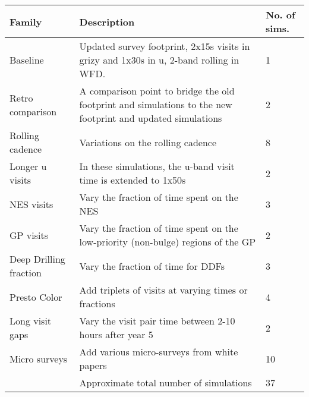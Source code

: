 
\begin{table}[]
\begin{tabular}{l | L | l}
Family               & Description       &    No. of sims.   \\
\hline\hline
Baseline            & Updated survey footprint, 2x15s visits in grizy and 1x30s in u, 2-band rolling in WFD. &   1     \\
Retro comparison     & A comparison point to bridge the old footprint and simulations to the new footprint and updated simulations  & 2 \\
Rolling cadence      & Variations on the rolling cadence   & 8  \\
Longer u visits  &  In these simulations, the u-band visit time is extended to 1x50s    &    2 \\
NES visits & Vary the fraction of time spent on the NES & 3 \\
GP visits & Vary the fraction of time spent on the low-priority (non-bulge) regions of the GP & 2 \\
Deep Drilling fraction & Vary the fraction of time for DDFs & 3 \\
Presto Color & Add triplets of visits at varying times or fractions  & 4 \\
Long visit gaps & Vary the visit pair time between 2-10 hours after year 5  &  2 \\
Micro surveys & Add various micro-surveys from white papers  & 10 \\
\hline
 & Approximate total number of simulations &  37 \\
\hline
\end{tabular}
\end{table}\label{tab:shortlist}